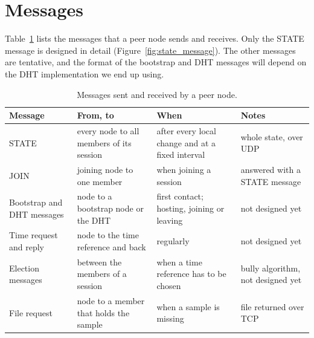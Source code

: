 \documentclass{article}
\begin{document}
\section{Messages}

Table~\ref{tab:messages} lists the messages that a peer node sends and receives. Only the STATE message is designed in detail (Figure~\ref{fig:state_message}). The other messages are tentative, and the format of the bootstrap and DHT messages will depend on the DHT implementation we end up using.

\begin{table}[htbp]
\centering
\footnotesize
\renewcommand{\arraystretch}{1.2}
\begin{tabular}{@{}>{\raggedright\arraybackslash}p{2.2cm}>{\raggedright\arraybackslash}p{3.2cm}>{\raggedright\arraybackslash}p{3.2cm}>{\raggedright\arraybackslash}p{2.2cm}@{}}
\hline
\textbf{Message} & \textbf{From, to} & \textbf{When} & \textbf{Notes} \\
\hline
STATE & every node to all members of its session & after every local change and at a fixed interval & whole state, over UDP \\
JOIN & joining node to one member & when joining a session & answered with a STATE message \\
Bootstrap and DHT messages & node to a bootstrap node or the DHT & first contact; hosting, joining or leaving & not designed yet \\
Time request and reply & node to the time reference and back & regularly & not designed yet \\
Election messages & between the members of a session & when a time reference has to be chosen & bully algorithm, not designed yet \\
File request & node to a member that holds the sample & when a sample is missing & file returned over TCP \\
\hline
\end{tabular}
\caption{Messages sent and received by a peer node.}
\label{tab:messages}
\end{table}
\end{document}
